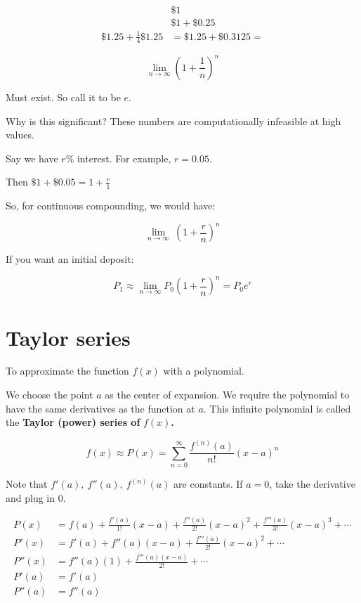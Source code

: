 \documentclass[12pt]{article}
\theoremstyle{plain}
\theoremstyle{remark}
\theoremstyle{definition}
\begin{document}
\begin{align*}
&\$ 1 \\
&\$ 1 + \$ 0.25 \\
\$ 1.25 + \frac{1}{4}\$ 1.25 &= \$ 1.25 + \$ 0.3125 =
\end{align*}


\[\lim_{n \rightarrow \infty}\left( 1 + \frac{1}{n} \right)^{n}\]

Must exist. So call it to be \(e\).

Why is this significant? These numbers are computationally infeasible at
high values.

Say we have \(r\%\) interest. For example, \(r = 0.05\).

Then \(\$ 1 + \$ 0.05 = 1 + \frac{r}{1}\)

So, for continuous compounding, we would have:

\[\lim_{n \rightarrow \infty}{\ \left( 1 + \frac{r}{n} \right)^{n}}\]

If you want an initial deposit:

\[P_{1} \approx \lim_{n \rightarrow \infty}{P_{0}\left( 1 + \frac{r}{n} \right)^{n}} = P_{0}e^{r}\]


\section{Taylor series}

To approximate the function \(f(x)\) with a polynomial.

We choose the point \(a\) as the center of expansion. We require the
polynomial to have the same derivatives as the function at \(a\). This
infinite polynomial is called the \textbf{Taylor (power) series of}
\(f(x)\)\textbf{.}

\[f(x) \approx P(x) = \sum_{n = 0}^{\infty}{\frac{f^{(n)}(a)}{n!}(x - a)^{n}}\]

Note that \(f'(a),\ f''(a),\ f^{(n)}(a)\) are constants. If
\(a = 0\), take the derivative and plug in 0.

\begin{align*}
P(x) &= f(a) + \frac{f'(a)}{1!}(x - a) + \frac{f''(a)}{2!}(x - a)^{2} + \frac{f'''(a)}{3!}(x - a)^{3} + \cdots \\
P'(x) &= f'(a) + f''(a)(x - a) + \frac{f'''(a)}{2!}(x - a)^{2} + \cdots \\
P''(x) &= f''(a)(1) + \frac{f'''(a)(x - a)}{2!} + \cdots \\
P'(a) &= f'(a) \\
P''(a) &= f''(a)
\end{align*}
\end{document}
